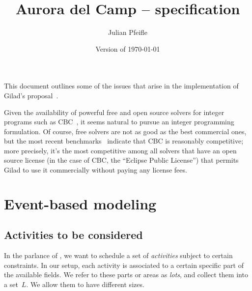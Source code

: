 \documentclass[11pt,reqno]{amsart}
\numberwithin{equation}{section}
\begin{document}
\renewcommand*\descriptionlabel[1]{%
\hspace\labelsep\normalfont\itshape #1:}

\newenvironment{mydesc}{%
  \begin{description}\setlength{\itemsep}{1ex}}%
  {\end{description}}

\title{Aurora del Camp -- specification}
\author{Julian Pfeifle}
\date{Version of \today}
\maketitle

This document outlines some of the issues that arise in the
implementation of Gilad's proposal~\cite{buzi11}.

\medskip
Given the availability of powerful free and open source solvers for
integer programs such as CBC~\cite{cbc}, it seems natural to pursue an
integer programming formulation. Of course, free solvers are not as
good as the best commercial ones, but the most recent
benchmarks~\cite{mittelmann11} indicate that CBC is reasonably
competitive; more precisely, it's the most competitive among all
solvers that have an open source license (in the case of CBC, the
``Eclipse Public License'') that permits Gilad to use it commercially
without paying any license fees.

\section{Event-based modeling}


\subsection{Activities to be considered}

In the parlance of \cite{artigues-etal11}, we want to schedule a set
of \emph{activities} subject to certain constraints. In our setup,
each activity is associated to a certain specific part of the
available fields. We refer to these parts or areas as \emph{lots}, and
collect them into a set~$L$. We allow them to have different
sizes.
\end{document}
